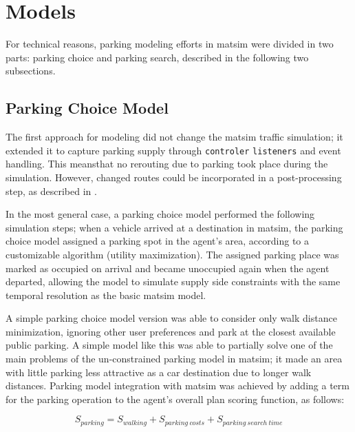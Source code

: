 \section{Models}
For technical reasons, parking modeling efforts in \gls{matsim} were divided in two parts: parking choice and parking search, described in the following two subsections. 

\subsection{Parking Choice Model}
The first approach for modeling did not change the \gls{matsim} traffic simulation; it extended it to capture parking supply through \lstinline|controler| \lstinline|listeners| and event handling. This meansthat no rerouting due to parking took place during the simulation. However, changed routes could be incorporated in a post-processing step, as described in \citet[][]{WaraichAxhausen_TRR_2012}. 

In the most general case, a parking choice model performed the following simulation steps; when a vehicle arrived at a destination in \gls{matsim}, the parking choice model assigned a parking spot in the agent's area, according to a customizable algorithm (\eg utility maximization). The assigned parking place was marked as occupied on arrival and became unoccupied again when the agent departed, allowing the model to simulate supply side constraints with the same temporal resolution as the basic \gls{matsim} model.

A simple parking choice model version was able to consider only walk distance minimization, ignoring other user preferences and park at the closest available public parking. A simple model like this was able to partially solve one of the main problems of the un-constrained parking model in \gls{matsim}; it made an area with little parking less attractive as a car destination due to longer walk distances. Parking model integration with \gls{matsim} was achieved by adding a term for the parking operation to the agent’s overall plan scoring function, as follows:

\begin{equation}
\label{eq:parkingutf}
S_{parking} = S_{walking} + S_{parking\ costs} + S_{parking\ search\ time}
\end{equation}

